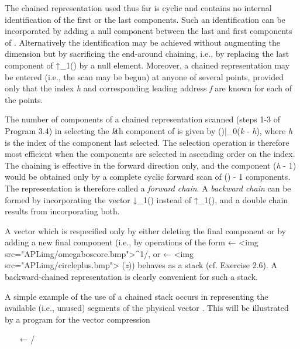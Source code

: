 {\par The chained representation used thus far is cyclic and contains no internal identification of the first or the last components. Such an identification can be incorporated by adding a null component between the last and first components of . Alternatively the identification may be achieved without augmenting the dimension but by sacrificing the end-around chaining, i.e., by replacing the last component of ↑\textbf{\Gamma}_{1}() by a null element. Moreover, a chained representation may be entered (i.e., the scan may be begun) at anyone of several points, provided only that the index \textit{h} and corresponding leading address \textit{f} are known for each of the points.

\par The number of components of a chained representation scanned (steps 1-3 of Program 3.4) in selecting the \textit{k}th component of  is given by 
\textit{\nu}()|_{0}(\textit{k} - \textit{h}), where \textit{h} is the index of the component last selected. The selection operation is therefore most efficient when the components are selected in ascending order on the index. The chaining is effective in the forward direction only, and the component (\textit{h} - 1) would be obtained only by a complete cyclic forward scan of \textit{\nu}() - 1 components. The representation is therefore called a \textit{forward chain}. A \textit{backward chain} can be formed by incorporating the vector 
↓\textbf{\Gamma}_{1}() instead of 
↑\textbf{\Gamma}_{1}(), and a double chain results from incorporating both.

\par A vector  which is respecified only by either deleting the final component or by adding a new final component (i.e., by operations of the form 
 ← <img src="APLimg/omegaboscore.bmp">^{1}/, or 
 ←  <img src="APLimg/circleplus.bmp"> (\textit{z})) behaves as a stack (cf. Exercise 2.6). A backward-chained representation is clearly convenient for such a stack.

\par A simple example of the use of a chained stack occurs in representing the available (i.e., unused) segments of the physical vector \textbf{\pi}. This will be illustrated by a program for the vector compression

\par \ \ \  ← /

}
